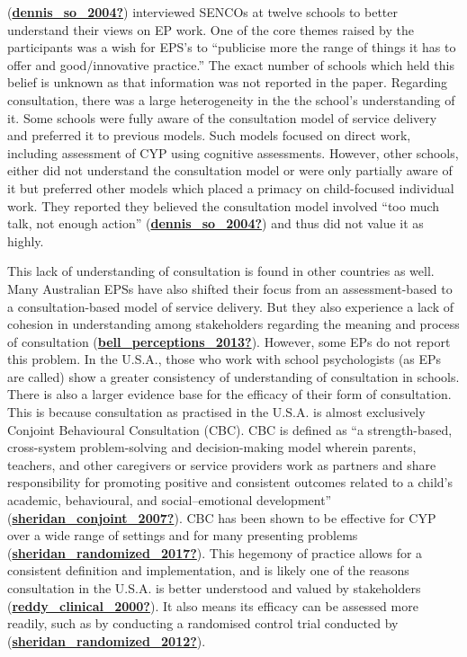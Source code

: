 \documentclass[
]{article}
\begin{document}
(\protect\hyperlink{ref-dennis_so_2004}{\textbf{dennis\_so\_2004?}})
interviewed SENCOs at twelve schools to better understand their views on
EP work. One of the core themes raised by the participants was a wish
for EPS's to ``publicise more the range of things it has to offer and
good/innovative practice.'' The exact number of schools which held this
belief is unknown as that information was not reported in the paper.
Regarding consultation, there was a large heterogeneity in the the
school's understanding of it. Some schools were fully aware of the
consultation model of service delivery and preferred it to previous
models. Such models focused on direct work, including assessment of CYP
using cognitive assessments. However, other schools, either did not
understand the consultation model or were only partially aware of it but
preferred other models which placed a primacy on child-focused
individual work. They reported they believed the consultation model
involved ``too much talk, not enough action''
(\protect\hyperlink{ref-dennis_so_2004}{\textbf{dennis\_so\_2004?}}) and
thus did not value it as highly.

This lack of understanding of consultation is found in other countries
as well. Many Australian EPSs have also shifted their focus from an
assessment-based to a consultation-based model of service delivery. But
they also experience a lack of cohesion in understanding among
stakeholders regarding the meaning and process of consultation
(\protect\hyperlink{ref-bell_perceptions_2013}{\textbf{bell\_perceptions\_2013?}}).
However, some EPs do not report this problem. In the U.S.A., those who
work with school psychologists (as EPs are called) show a greater
consistency of understanding of consultation in schools. There is also a
larger evidence base for the efficacy of their form of consultation.
This is because consultation as practised in the U.S.A. is almost
exclusively Conjoint Behavioural Consultation (CBC). CBC is defined as
``a strength-based, cross-system problem-solving and decision-making
model wherein parents, teachers, and other caregivers or service
providers work as partners and share responsibility for promoting
positive and consistent outcomes related to a child's academic,
behavioural, and social--emotional development''
(\protect\hyperlink{ref-sheridan_conjoint_2007}{\textbf{sheridan\_conjoint\_2007?}}).
CBC has been shown to be effective for CYP over a wide range of settings
and for many presenting problems
(\protect\hyperlink{ref-sheridan_randomized_2017}{\textbf{sheridan\_randomized\_2017?}}).
This hegemony of practice allows for a consistent definition and
implementation, and is likely one of the reasons consultation in the
U.S.A. is better understood and valued by stakeholders
(\protect\hyperlink{ref-reddy_clinical_2000}{\textbf{reddy\_clinical\_2000?}}).
It also means its efficacy can be assessed more readily, such as by
conducting a randomised control trial conducted by
(\protect\hyperlink{ref-sheridan_randomized_2012}{\textbf{sheridan\_randomized\_2012?}}).
\end{document}
